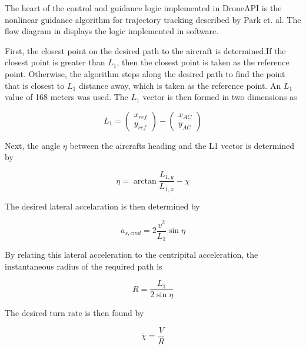 \documentclass{aiaa}
\begin{document}
The heart of the control and guidance logic implemented in DroneAPI is the nonlinear guidance algorithm for trajectory tracking described by Park et. al. The flow diagram in  displays the logic implemented in software. 


First, the closest point on the desired path to the aircraft is determined.If the closest point is greater than $L_1$, then the closest point is taken as the reference point. Otherwise, the algorithm steps along the desired path to find the point that is closest to $L_1$ distance away, which is taken as the reference point. An $L_1$ value of 168 meters was used. The $L_1$ vector is then formed in two dimensions as

\begin{equation}
	L_1 = 
    \begin{pmatrix}
    	x_{ref}\\
        y_{ref}
    \end{pmatrix}
    -
    \begin{pmatrix}
    	x_{AC}\\
        y_{AC}
    \end{pmatrix}
\end{equation}

Next, the angle $\eta$ between the aircrafts heading and the L1 vector is determined by

\begin{equation}
	\eta = \arctan{\frac{L_{1,y}}{L_{1,x}}} - \chi
\end{equation}

The desired lateral accelaration is then determined by

\begin{equation}
	a_{s,cmd} = 2\frac{v^2}{L_1}\sin{\eta}
    \end{equation}
    
    By relating this lateral acceleration to the centripital acceleration, the instantaneous radius of the required path is
    
    \begin{equation}
    R = \frac{L_1}{2\sin{\eta}}
    \end{equation}
    
    The desired turn rate is then found by
    
    \begin{equation}
    \dot{\chi} = \frac{V}{R}
    \end{equation}
\end{document}
